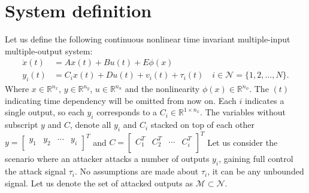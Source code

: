\section{System definition}\label{ch:system-definition}
Let us define the following continuous nonlinear time invariant multiple-input multiple-output system:
\begin{equation}\label{eqn:standard-system}
    \begin{split}
        \dot{x}(t) &= Ax(t) + Bu(t) + E\phi(x) \\
        y_i(t) &= C_ix(t) + Du(t) + v_i(t) + \tau_i(t) \quad i \in \mathcal{N} = \{1,2,\dots,N\}.
    \end{split}
\end{equation}
Where $x \in \mathbb{R}^{n_x}$, $y \in \mathbb{R}^{n_y}$, $u \in \mathbb{R}^{n_u}$ and the nonlinearity $\phi(x) \in \mathbb{R}^{n_{\phi}}$. The $(t)$ indicating time dependency will be omitted from now on. Each $i$ indicates a single output, so each $y_i$ corresponds to a $C_i \in \mathbb{R}^{1 \times n_x}$. The variables without subscript $y$ and $C$, denote all $y_i$ and $C_i$ stacked on top of each other 
$y = 
\begin{bmatrix}
    y_1 & y_2 & \cdots & y_{i} \\
\end{bmatrix}^{T}$ and
$C =
\begin{bmatrix}
    C_1^T & C_2^T & \cdots & C_i^T \\
\end{bmatrix}^{T}$
Let us consider the scenario where an attacker attacks a number of outputs $y_i$, gaining full control the attack signal $\tau_i$. No assumptions are made about $\tau_i$, it can be any unbounded signal. Let us denote the set of attacked outputs as $\mathcal{M} \subset \mathcal{N}$. \\

